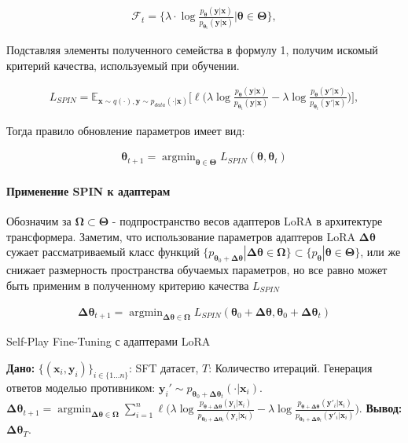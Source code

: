 \documentclass[12pt, twoside]{article}
\newcommand{\bx}{\mathbf{x}}
\newcommand{\by}{\mathbf{y}}
\newcommand{\bOmega}{\boldsymbol{\Omega}}
\newcommand{\btheta}{\boldsymbol{\theta}}
\newcommand{\bTheta}{\boldsymbol{\Theta}}
\newcommand{\bDelta}{\boldsymbol{\Delta}}
\newcommand{\cF}{\mathcal{F}}
\newcommand{\EE}{\mathbb{E}}
\newcommand{\argmin}{\mathop{\mathrm{argmin}}}
\begin{document}
\begin{align}
\cF_{t} = \bigg\{\lambda\cdot \log \frac{p_{\btheta}(\by | \bx)}{p_{\mathrm{\btheta_t}}(\by | \bx)}\bigg|\btheta \in \bTheta\bigg\},   \label{eq:function class0} 
\end{align}

Подставляя элементы полученного семейства в формулу 1, получим искомый критерий качества, используемый при обучении.

\begin{align}
L_{SPIN}= \EE_{\bx\sim q(\cdot), \by\sim p_{data}(\cdot | \bx)}\bigg[\ell\bigg(\lambda \log \frac{p_{\btheta}(\by | \bx)}{p_{\btheta_t}(\by | \bx)}-\lambda \log \frac{p_{\btheta}(\by' | \bx)}{p_{\btheta_t}(\by' | \bx)}\bigg)\bigg], \label{eq:loss}  
\end{align}

Тогда правило обновление параметров имеет вид:

\begin{align}
    \btheta_{t+1} = \argmin_{\btheta \in \bTheta} L_{SPIN} (\btheta, \btheta_t)
\end{align}


\paragraph{Применение SPIN к адаптерам}

Обозначим за $\bOmega \subset \bTheta$ - подпространство весов адаптеров LoRA в архитектуре трансформера. Заметим, что использование параметров адаптеров LoRA $\bDelta\btheta$ сужает рассматриваемый класс функций $\{p_{\btheta_0 + \bDelta\btheta} | \bDelta\btheta \in \bOmega\} \subset \{p_{\btheta} | \btheta \in \bTheta\}$, или же снижает размерность пространства обучаемых параметров, но все равно может быть применим в полученному критерию качества $L_{SPIN}$

\begin{align}
    \bDelta\btheta_{t+1} = \argmin_{\bDelta\btheta \in \bOmega} L_{SPIN} (\btheta_0 + \bDelta\btheta, \btheta_0 + \bDelta \btheta_t)
\end{align}

\begin{algorithm}[ht!]
\caption{Self-Play Fine-Tuning с адаптерами LoRA}\label{alg:Improving}
\begin{algorithmic}%
\STATE \textbf{Дано:} $\{(\bx_i, \by_i)\}_{i\in \{1 ... n\}}$: SFT датасет, $T$: Количество итераций. 
\STATE Генерация ответов моделью противником: $\by_{i}' \sim p_{\btheta_0 + \bDelta \btheta_t}(\cdot|\bx_i)$.
\ENDFOR 
\STATE  $\bDelta\btheta_{t+1} = \argmin_{\bDelta\btheta \in \bOmega} \sum_{i = 1}^n\ell\Big(\lambda \log \frac{p_{\btheta + \bDelta \btheta}(\by_i | \bx_i)}{p_{\btheta_0 + \bDelta \btheta_t}(\by_i | \bx_i)}-\lambda \log \frac{p_{\btheta + \bDelta \btheta}(\by'_i | \bx_i)}{p_{\btheta_0 + \bDelta \btheta_t}(\by'_i | \bx_i)}\Big)$.
\ENDFOR
\STATE \textbf{Вывод:} $\bDelta \btheta_T$.
\end{algorithmic}
\end{algorithm}
\end{document}
